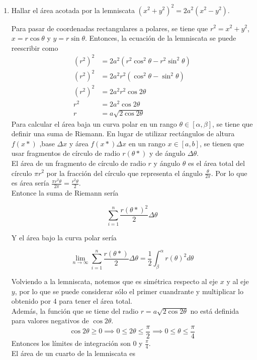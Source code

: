 \documentclass{article}
\begin{document}
\begin{enumerate}
        \item {
            Hallar el área acotada por la lemniscata
            \(
                \left(x^2+y^2\right)^2=2a^2\left(x^2-y^2\right)
            \).

            \color{azul}
          	Para pasar de coordenadas rectangulares a polares, se tiene que
						$r^2 = x^2+y^2$, $x = r\cos \theta$ y  $y = r\sin \theta$.
						Entonces, la ecuación de la lemniscata se puede reescribir como
						\begin{align*}
							(r^2)^2 &= 2a^2(r^2 \cos^2 \theta - r^2 \sin^2 \theta)\\
							(r^2)^2 &= 2a^2r^2(\cos^2 \theta - \sin^2 \theta)\\
							(r^2)^2 &= 2a^2r^2\cos2\theta\\
							r^2 &= 2a^2\cos2\theta\\
							r &= a\sqrt{2\cos2\theta}
						\end{align*}
						Para calcular el área baja un curva polar en un rango
						$\theta \in[\alpha, \beta]$, se tiene que definir una
						suma de Riemann. En lugar de utilizar rectángulos de altura $f(x*)$
						,base $\Delta x$ y área $f(x*)\Delta x$ en un rango $x\in[a, b]$,
						se tienen que usar fragmentos de círculo de radio $r(\theta *)$
						y de ángulo $\Delta \theta$.\\
						El área de un fragmento de círculo de radio $r$ y ángulo $\theta$
						es el área total del círculo $\pi r^2$ por la fracción del círculo
						que representa el ángulo $\frac{\theta}{2\pi}$. Por lo que es área
						sería $\frac{\pi r ^2\theta}{2\pi} = \frac{r^2\theta}{2}$.\\
						Entonce la suma de Riemann sería

						\[\sum_{i = 1}^n {\frac{r(\theta *)^2}{2}}\Delta \theta\]

						Y el área bajo la curva polar sería

						\[
							\lim_{n \to \infty}\sum_{i = 1}^n {\frac{r(\theta *)}{2}}\Delta \theta
							= \frac{1}{2}\int_\beta^\alpha {r(\theta)^2}d\theta
						\]

						Volviendo a la lemniscata, notemos que es simétrica respecto al eje
						$x$ y al eje $y$, por lo que se puede considerar sólo el primer
						cuandrante y multiplicar lo obtenido por 4 para tener el área total.\\
						Además, la función que se tiene del radio $r = a\sqrt{2\cos2\theta}$
						no está definida para valores negativos de $\cos2\theta$.
						\[
							\cos2\theta \geq 0 \implies 0 \leq 2\theta \leq \frac{\pi}{2}
							\implies 0 \leq \theta \leq \frac{\pi}{4}
						\]
						Entonces los límites de integración son 0 y $\frac{\pi}{4}$.\\
						El área de un cuarto de la lemniscata es

}
\end{enumerate}
\end{document}
